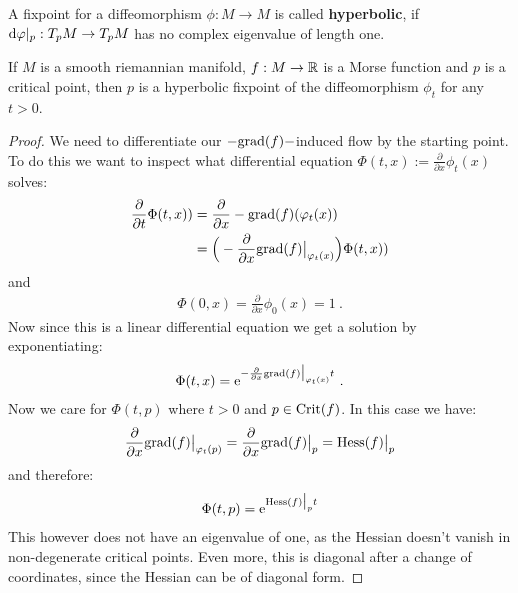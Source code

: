 \begin{definition}
	A fixpoint for a diffeomorphism $\phi:M\to M$ is called \textbf{hyperbolic}, if $\mathop{}\!\mathrm{d} \varphi|_p:T_pM\to T_pM$ has no complex eigenvalue of length one.    
\end{definition}
\begin{remark} \label{rem: critical points are hyperbolic fixpoints}
	If $M$ is a smooth riemannian manifold, $f:M\to \mathbb{R}$ is a Morse function and $p$ is a critical point, then $p$ is a hyperbolic fixpoint of the diffeomorphism $\phi_t$ for any $t>0$.
\end{remark}
\begin{proof}
	We need to differentiate our $-\mathrm{grad}(f)-$induced flow by the starting point. To do this we want to inspect what differential equation $\Phi(t,x):=\frac{\partial}{\partial x}\phi_t(x)$ solves:
	\begin{align*}
		\frac{\partial}{\partial t} \Phi(t,x))   &= \frac{\partial}{\partial x} -\mathrm{grad}(f)(\varphi_t(x)) \\
		&=\Big(-\frac{\partial }{\partial x} \mathrm{grad}(f)\big|_{\varphi_t(x)} \Big) \Phi(t,x))
	\end{align*} and 
	\begin{align*}
		\Phi(0,x)=\frac{\partial}{\partial x}\phi_0(x)=1~.
	\end{align*}
	Now since this is a linear differential equation we get a solution by exponentiating:
	\begin{align*}
		\Phi(t,x)=\mathrm{e}^{-\frac{\partial }{\partial x} \mathrm{grad}(f)\big|_{\varphi_t(x)} t}~.
	\end{align*}
	Now we care for $\Phi(t,p)$ where $t>0$ and $p\in\mathrm{Crit}(f)$. In this case we have:
	\begin{align*}
		\frac{\partial }{\partial x} \mathrm{grad}(f)\big|_{\varphi_t(p)}=\frac{\partial }{\partial x} \mathrm{grad}(f)\big|_{p}=\operatorname{\mathrm{Hess}}(f)\big|_p
	\end{align*} and therefore:
	\begin{align*}
		\Phi(t,p)=\mathrm{e} ^{\operatorname{\mathrm{Hess}}(f)\big|_p t}
	\end{align*} This however does not have an eigenvalue of one, as the Hessian doesn't vanish in non-degenerate critical points. Even more, this is diagonal after a change of coordinates, since the Hessian can be of diagonal form.
\end{proof}


